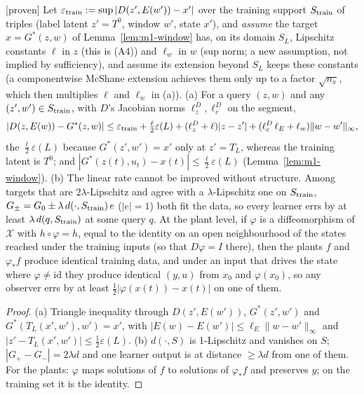 \begin{corollary}\label{cor:m1-ood}
[proven] Let $\varepsilon_{\rm train}:=\sup|D(z',E(w'))-x'|$ over the training support $S_{\rm train}$ of triples
(label latent $z'=T^0$, window $w'$, state $x'$), and \emph{assume} the target $x=G^*(z,w)$ of Lemma~\ref{lem:m1-window}
has, on its domain $S_L$, Lipschitz constants $\ell$ in $z$ (this is (A4)) and $\ell_w$ in $w$ (sup norm; a new assumption,
not implied by sufficiency), and assume its extension beyond $S_L$ keeps these constants (a componentwise McShane
extension achieves them only up to a factor $\sqrt{n_x}$, which then multiplies $\ell$ and $\ell_w$ in (a)).
(a) For a query $(z,w)$ and any $(z',w')\in S_{\rm train}$, with $D$'s Jacobian norms $\ell^D_z,\ell^D_c$ on the segment,
\[
|D(z,E(w))-G^*(z,w)|\le\varepsilon_{\rm train}+\tfrac{\ell}{2}\varepsilon(L)+(\ell^D_z+\ell)|z-z'|+(\ell^D_c\,\ell_E+\ell_w)\|w-w'\|_\infty ,
\]
the $\tfrac{\ell}{2}\varepsilon(L)$ because $G^*(z',w')=x'$ only at $z'=T_L$, whereas the training latent is $T^0$; and
$|G^*(z(t),u_t)-x(t)|\le\tfrac{\ell}{2}\varepsilon(L)$ (Lemma~\ref{lem:m1-window}).
(b) The linear rate cannot be improved without structure. Among targets that are $2\lambda$-Lipschitz and agree with a
$\lambda$-Lipschitz one on $S_{\rm train}$, $G_\pm=G_0\pm\lambda\,d(\cdot,S_{\rm train})\,e$ ($|e|=1$) both fit the data,
so every learner errs by at least $\lambda\,d(q,S_{\rm train})$ at some query $q$. At the plant level, if $\varphi$ is a
diffeomorphism of $\mathcal X$ with $h\circ\varphi=h$, equal to the identity on an open neighbourhood of the states reached
under the training inputs (so that $D\varphi=I$ there), then the plants $f$ and $\varphi_*f$ produce identical training
data, and under an input that drives the state where $\varphi\neq\mathrm{id}$ they produce identical $(y,u)$ from $x_0$ and
$\varphi(x_0)$, so any observer errs by at least $\tfrac12|\varphi(x(t))-x(t)|$ on one of them.
\end{corollary}
\begin{proof}
(a) Triangle inequality through $D(z',E(w'))$, $G^*(z',w')$ and $G^*(T_L(x',w'),w')=x'$, with
$|E(w)-E(w')|\le\ell_E\|w-w'\|_\infty$ and $|z'-T_L(x',w')|\le\tfrac12\varepsilon(L)$.
(b) $d(\cdot,S)$ is 1-Lipschitz and vanishes on $S$; $|G_+-G_-|=2\lambda d$ and one learner output is at distance
$\ge\lambda d$ from one of them. For the plants: $\varphi$ maps solutions of $f$ to solutions of $\varphi_*f$ and preserves
$y$; on the training set it is the identity.
\end{proof}

